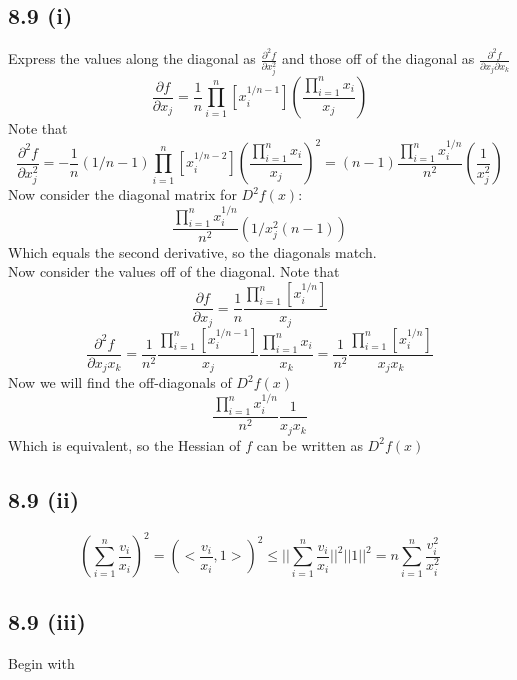 \documentclass[letterpaper,12pt]{article}
\theoremstyle{definition}
\begin{document}
\subsection*{8.9 (i)}

Express the values along the diagonal as $\frac{\partial^2 f}{\partial x_j^2}$ and those off of the diagonal as $\frac{\partial^2 f}{\partial x_j \partial x_k}$
\[\frac{\partial{f}}{\partial{x}_j}=\frac{1}{n}\prod_{i=1}^n [x_i^{1/n-1}](\frac{\prod_{i=1}^nx_i}{x_j})\]
Note that
\[\frac{\partial^2f}{\partial x_j^2}=-\frac{1}{n}(1/n-1)\prod_{i=1}^n[x_i^{1/n-2}](\frac{\prod_{i=1}^nx_i}{x_j})^2=(n-1)\frac{\prod_{i=1}^nx_i^{1/n}}{n^2}(\frac{1}{x_j^2})\]
Now consider the diagonal matrix for $D^2f(x)$:
\[\frac{\prod_{i=1}^nx_i^{1/n}}{n^2}(1/x_j^2(n-1))\]
Which equals the second derivative, so the diagonals match.\\
Now consider the values off of the diagonal. Note that
\[\frac{\partial{f}}{\partial{x}_j}=\frac{1}{n}\frac{\prod_{i=1}^n [x_i^{1/n}]}{x_j}\]
\[\frac{\partial^2f}{\partial x_jx_k}=\frac{1}{n^2}\frac{\prod_{i=1}^n [x_i^{1/n-1}]}{x_j}\frac{\prod_{i=1}^n x_i}{x_k}=\frac{1}{n^2}\frac{\prod_{i=1}^n [x_i^{1/n}]}{x_jx_k}\]
Now we will find the off-diagonals of $D^2f(x)$
\[\frac{\prod_{i=1}^nx_i^{1/n}}{n^2}\frac{1}{x_jx_k}\]
Which is equivalent, so the Hessian of $f$ can be written as $D^2f(x)$  
\\
\subsection*{8.9 (ii)}


\[(\sum_{i=1}^n\frac{v_i}{x_i})^2 =(<\frac{v_i}{x_i},1>)^2\le ||\sum_{i=1}^n\frac{v_i}{x_i}||^2||1||^2 =n \sum_{i=1}^n\frac{v_i^2}{x_i^2} \]

\subsection*{8.9 (iii)}


Begin with
\end{document}
